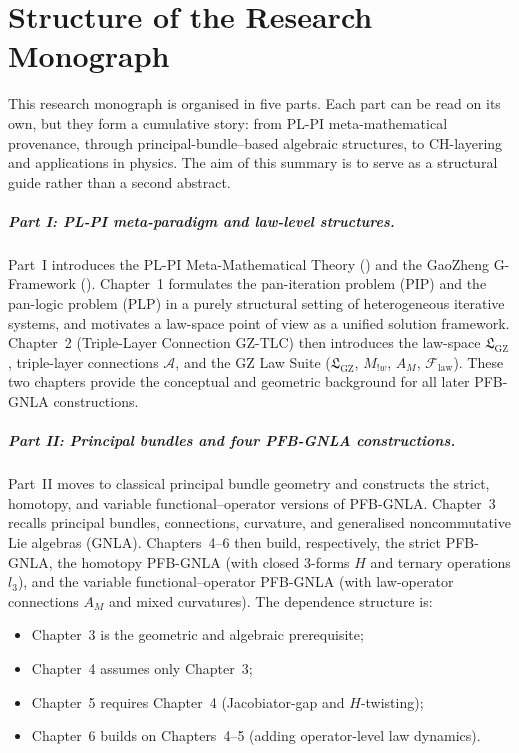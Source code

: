 \documentclass[11pt]{book}
\theoremstyle{plain}
\theoremstyle{definition}
\newcommand{\PLPIMMT}{\text{PL-PI MMT}}
\newcommand{\GFramework}{\text{G-Framework}} \newcommand{\GAlgebra}{\text{G-Algebra}}
\newcommand{\GZLS}{\ensuremath{\mathfrak{L}_{\mathrm{GZ}}}}       \newcommand{\GZLT}{\ensuremath{M_{!w}}}                           \newcommand{\GZLOC}{\ensuremath{A_M}}                             \newcommand{\GZLCurv}{\ensuremath{\mathcal{F}_{\mathrm{law}}}}
\newcommand{\GZTLCtxt}{\textsf{GZ-TLC}}                           \newcommand{\GZTLC}{\ensuremath{\mathcal{A}}}                     \newcommand{\GZGMS}{\textsf{GZ-GMS}}
\begin{document}
\chapter*{Structure of the Research Monograph}


This research monograph is organised in five parts. Each part can be read on its
own, but they form a cumulative story: from PL-PI meta-mathematical
provenance, through principal-bundle–based algebraic structures, to
CH-layering and applications in physics. The aim of this summary is to
serve as a structural guide rather than a second abstract.



\paragraph*{Part I: PL-PI meta-paradigm and law-level structures.}


Part~I introduces the PL-PI Meta-Mathematical Theory (\PLPIMMT) and the
GaoZheng G-Framework (\GFramework). Chapter~1 formulates the
pan-iteration problem (PIP) and the pan-logic problem (PLP) in a purely
structural setting of heterogeneous iterative systems, and motivates a
law-space point of view as a unified solution framework. Chapter~2
(Triple-Layer Connection \GZTLCtxt) then introduces the
law-space \GZLS, triple-layer connections \GZTLC, and the GZ Law Suite
(\GZLS, \GZLT, \GZLOC, \GZLCurv). These two chapters provide the
conceptual and geometric background for all later PFB-GNLA constructions.



\paragraph*{Part II: Principal bundles and four PFB-GNLA constructions.}


Part~II moves to classical principal bundle geometry and constructs the
strict, homotopy, and variable functional–operator versions of
PFB-GNLA. Chapter~3 recalls principal bundles, connections, curvature,
and generalised noncommutative Lie algebras (GNLA). Chapters~4–6 then
build, respectively, the strict PFB-GNLA, the homotopy PFB-GNLA (with
closed 3-forms $H$ and ternary operations $l_3$), and the variable
functional–operator PFB-GNLA (with law-operator connections $A_M$ and
mixed curvatures). The dependence structure is:



\begin{itemize}
  \item Chapter~3 is the geometric and algebraic prerequisite;
  \item Chapter~4 assumes only Chapter~3;
  \item Chapter~5 requires Chapter~4 (Jacobiator-gap and $H$-twisting);
  \item Chapter~6 builds on Chapters~4–5 (adding operator-level law
        dynamics).
\end{itemize}
\end{document}
